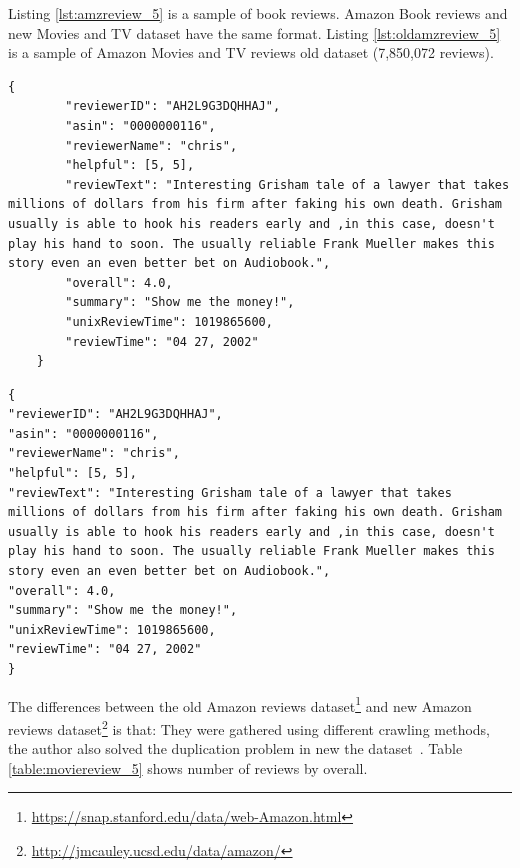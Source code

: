 Listing \ref{lst:amzreview_5} is a sample of book reviews.
Amazon Book reviews and new Movies and TV dataset have the same format. Listing \ref{lst:oldamzreview_5} is a sample of Amazon Movies and TV reviews old dataset (7,850,072 reviews).

\begin{lstlisting}[caption={Amazon reviews sample},label={lst:amzreview_5}]
    {
        "reviewerID": "AH2L9G3DQHHAJ",
        "asin": "0000000116",
        "reviewerName": "chris",
        "helpful": [5, 5],
        "reviewText": "Interesting Grisham tale of a lawyer that takes millions of dollars from his firm after faking his own death. Grisham usually is able to hook his readers early and ,in this case, doesn't play his hand to soon. The usually reliable Frank Mueller makes this story even an even better bet on Audiobook.",
        "overall": 4.0,
        "summary": "Show me the money!",
        "unixReviewTime": 1019865600,
        "reviewTime": "04 27, 2002"
    }
\end{lstlisting}

\begin{lstlisting}[caption={Old Amazon reviews sample},label={lst:oldamzreview_5}]
{
"reviewerID": "AH2L9G3DQHHAJ",
"asin": "0000000116",
"reviewerName": "chris",
"helpful": [5, 5],
"reviewText": "Interesting Grisham tale of a lawyer that takes millions of dollars from his firm after faking his own death. Grisham usually is able to hook his readers early and ,in this case, doesn't play his hand to soon. The usually reliable Frank Mueller makes this story even an even better bet on Audiobook.",
"overall": 4.0,
"summary": "Show me the money!",
"unixReviewTime": 1019865600,
"reviewTime": "04 27, 2002"
}
\end{lstlisting}

The differences between the old Amazon reviews dataset\footnote{\url{https://snap.stanford.edu/data/web-Amazon.html}} and new Amazon reviews dataset\footnote{\url{http://jmcauley.ucsd.edu/data/amazon/}} is that:
They were gathered using different crawling methods, the author also solved the duplication problem in new the dataset~\cite{amazon-reviews}.
Table \ref{table:moviereview_5} shows number of reviews by overall.

